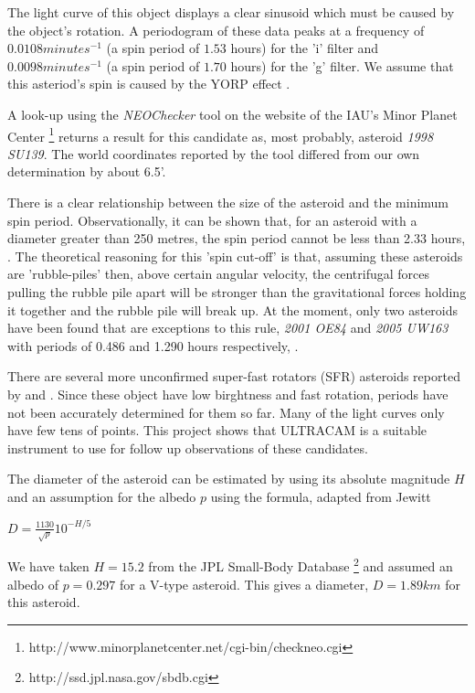   The light curve of this object displays a clear sinusoid which must be caused by the object's rotation. A periodogram of these data peaks at a frequency of $0.0108 minutes^{-1}$ (a spin period of $1.53$ hours) for the 'i' filter and $0.0098 minutes^{-1}$ (a spin period of $1.70$ hours) for the 'g' filter. We assume that this asteriod's spin is caused by the YORP effect \cite{yorpeffect}. 

  A look-up using the \emph{NEOChecker} tool on the website of the IAU's Minor Planet Center \footnote{http://www.minorplanetcenter.net/cgi-bin/checkneo.cgi} returns a result for this candidate as, most probably, asteroid \emph{1998 SU139}. The world coordinates reported by the tool differed from our own determination by about 6.5'. 

  There is a clear relationship between the size of the asteroid and the minimum spin period. Observationally, it can be shown that, for an asteroid with a diameter greater than 250 metres, the spin period cannot be less than 2.33 hours, \cite{Jacobson2014}. The theoretical reasoning for this 'spin cut-off'  is that, assuming these asteroids are 'rubble-piles' then, above certain angular velocity, the centrifugal forces pulling the rubble pile apart will be stronger than the gravitational forces holding it together and the rubble pile will break up. At the moment, only two asteroids have been found that are exceptions to this rule, \emph{2001 OE84} and \emph{2005 UW163} with periods of 0.486 and 1.290 hours respectively, \cite{Chang2014}. 

  There are several more unconfirmed super-fast rotators (SFR) asteroids reported by \cite{Masiero2009} and \cite{Dermawan2011}. Since these object have low birghtness and fast rotation, periods have not been accurately determined for them so far. Many of the light curves only have few tens of points. This project shows that ULTRACAM is a suitable instrument to use for follow up observations of these candidates.  

  The diameter of the asteroid can be estimated by using its absolute magnitude $H$ and an assumption for the albedo $p$ using the formula, adapted from Jewitt \cite{Jewitt2013}

  $D = \frac{1130}{\sqrt{p}}10^{-H/5} $

  We have taken $H = 15.2$ from the JPL Small-Body Database \footnote{http://ssd.jpl.nasa.gov/sbdb.cgi} and assumed an albedo of $ p = 0.297$ for a V-type asteroid. This gives a diameter, $D = 1.89 km$ for this asteroid. 

